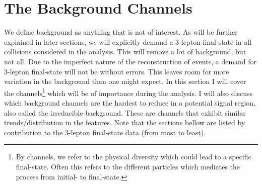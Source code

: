\section{The Background Channels}
We define background as anything that is not of interest. As will be further explained in  later sections,
we will explicitly demand a 3-lepton final-state in all collisions considered in the analysis. This will 
remove a lot of background, but not all. Due to the imperfect nature of the reconstruction of events,
a demand for 3-lepton final-state will not be without errors. This leaves room for more variation in 
the background than one might expect. In this section I will cover the channels\footnote{By channels,
we refer to the physical diversity which could lead to a specific final-state. Often this refers to 
the different particles which mediates the process from initial- to final-state.} which will 
be of importance during the analysis. I will also discuss which background channels are the hardest 
to reduce in a potential signal region, also called the irreducible background. These are 
channels that exhibit similar trends/distribution in the features. Note that the sections bellow
are listed by contribution to the 3-lepton final-state data (from most to least).  

